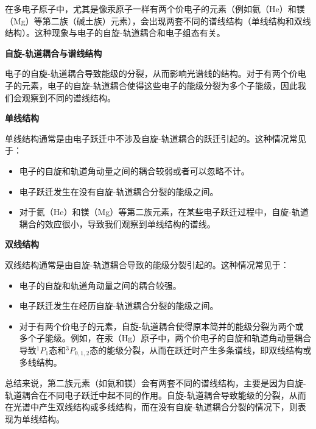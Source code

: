 \documentclass[dvipsnames, svgnames,a4paper,11pt]{article}
\begin{document}
	在多电子原子中，尤其是像汞原子一样有两个价电子的元素（例如氦（He）和镁（Mg）等第二族（碱土族）元素），会出现两套不同的谱线结构（单线结构和双线结构）。这种现象与电子的自旋-轨道耦合和电子组态有关。

	\textbf{自旋-轨道耦合与谱线结构}
	
	电子的自旋-轨道耦合导致能级的分裂，从而影响光谱线的结构。对于有两个价电子的元素，电子的自旋-轨道耦合使得这些电子的能级分裂为多个子能级，因此我们会观察到不同的谱线结构。

	\textbf{单线结构}
	
	单线结构通常是由电子跃迁中不涉及自旋-轨道耦合的跃迁引起的。这种情况常见于：

		\begin{itemize}
			\item 电子的自旋和轨道角动量之间的耦合较弱或者可以忽略不计。
			\item 电子跃迁发生在没有自旋-轨道耦合分裂的能级之间。
			\item 对于氦（He）和镁（Mg）等第二族元素，在某些电子跃迁过程中，自旋-轨道耦合的效应很小，导致我们观察到单线结构的谱线。
		\end{itemize}


	\textbf{双线结构}
	
	双线结构通常是由自旋-轨道耦合导致的能级分裂引起的。这种情况常见于：

		\begin{itemize}
			\item 电子的自旋和轨道角动量之间的耦合较强。
			\item 电子跃迁发生在经历自旋-轨道耦合分裂的能级之间。
			\item 对于有两个价电子的元素，自旋-轨道耦合使得原本简并的能级分裂为两个或多个子能级。例如，在汞（Hg）原子中，两个价电子的自旋和轨道角动量耦合导致$^1P_1$态和$^3P_{0,1,2}$态的能级分裂，从而在跃迁时产生多条谱线，即双线结构或多线结构。
		\end{itemize}


	

	
	总结来说，第二族元素（如氦和镁）会有两套不同的谱线结构，主要是因为自旋-轨道耦合在不同电子跃迁中起不同的作用。自旋-轨道耦合导致能级的分裂，从而在光谱中产生双线结构或多线结构，而在没有自旋-轨道耦合分裂的情况下，则表现为单线结构。
\end{document}
